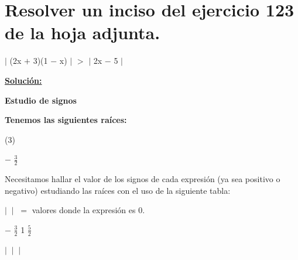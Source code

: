\documentclass[12pt]{article}
\newenvironment{MyColorPar}[1]{%
    \leavevmode\color{#1}\ignorespaces%
}{%
}%
\begin{document}
\setlength{\arrayrulewidth}{1pt}
\pagestyle{empty} 
\sffamily
\setlength{\parindent}{0pt}

\section*{\textsf{Resolver un inciso del ejercicio 123 de la hoja adjunta.}} \vspace{0.4cm}

\begin{enumerate}[label=\alph*), start=3]
    {\Large{\item $\mid$ (2x $+$ 3)(1 $-$ x) $\mid$ $>$ $\mid$ 2x $-$ 5 $\mid$}}  
\end{enumerate} \vspace{0.5cm}

{\bfseries{{\textcolor{Milano Red}{\underline{Solución:}}}}} \vspace{0.5cm}

\begin{MyColorPar}{Tarawera}
{\bfseries{Estudio de signos}} 
\end{MyColorPar}


{\bfseries{Tenemos las siguientes raíces:}} \vspace{0.5cm}

\begin{tasks}[style=itemize, item-format={\normalfont\sf}, after-item-skip=4mm](3)

\task $-$ {\LARGE{$\frac{3}{2}$}}
\end{tasks} \vspace{0.5cm}

Necesitamos hallar el valor de los signos de cada expresión (ya sea {\textcolor{Earls Green}{positivo}} o {\textcolor{Cinnabar}{negativo}}) estudiando las raíces con el uso de la siguiente tabla: \vspace{1cm}

{\textcolor{palatinateblue}{$ \big |\ $}} {\textcolor{palatinateblue}{$ \big |\ $}} $=$ valores donde la expresión es $0$.

\hspace{7.35cm} $-$ {\LARGE{$\frac{3}{2}$}} \hspace{2.75cm} {\large{1}} \hspace{2.7cm} {\LARGE{$\frac{5}{2}$}} \vspace{0.2cm}

\hspace{7.9cm}  {$\big |\ $} \hspace{2.73cm}  {$\big |\ $} \hspace{2.75cm}  {$\big |\ $}
\end{document}
